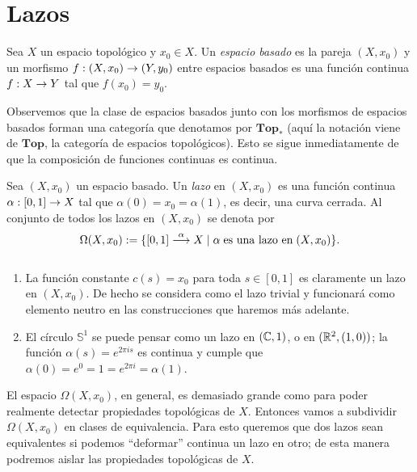 \documentclass[../../topologia_algebraica]{subfiles}
\begin{document}
\section{Lazos}
\begin{defin}
  Sea $X$ un espacio topol\'ogico y $x_0\in X$. Un \emph{espacio basado} es la pareja
  $(X,x_0)$ y un morfismo $f:(X,x_0)\rightarrow(Y,y_0)$ entre espacios basados es una funci\'on
  continua $f:X\rightarrow Y$ tal que $f(x_0)=y_0$.
\end{defin}

Observemos que la clase de espacios basados junto con los morfismos de espacios basados
forman una categor\'ia que denotamos por $\mathbf{Top}_*$ (aqu\'i la notaci\'on viene de
$\mathbf{Top}$, la categor\'ia de espacios topol\'ogicos). Esto se sigue inmediatamente
de que la composici\'on de funciones continuas es continua.

\begin{defin}
  Sea $(X,x_0)$ un espacio basado. Un \emph{lazo} en $(X,x_0)$ es una funci\'on continua
  $\alpha:[0,1]\rightarrow X$ tal que $\alpha(0)=x_0=\alpha(1)$, es decir, una curva cerrada. Al
  conjunto de todos los lazos en $(X,x_0)$ se denota por
  \[
    \Omega(X,x_0):=\{[0,1]\overset{\alpha}{\longrightarrow} X \mid \alpha\;\text{es una lazo en}\;(X,x_0)\}.
  \]
\end{defin}
\begin{ejemplo}\label{ejemplo:lazo}$\;$\\
  \begin{enumerate}
  \item La funci\'on constante $c(s)=x_0$ para toda $s\in[0,1]$ es claramente un lazo
    en $(X,x_0)$. De hecho se considera como el lazo trivial y funcionar\'a como elemento
    neutro en las construcciones que haremos m\'as adelante.
  \item El c\'irculo $\mathbb{S}^1$ se puede pensar como un lazo en $(\mathbb{C},1)$, o en $(\mathbb{R}^2,(1,0))$;
    la funci\'on $\alpha(s)=e^{2\pi i s}$ es continua y cumple que $\alpha(0)=e^0=1=e^{2\pi i}=\alpha(1)$.
  \end{enumerate}
\end{ejemplo}

El espacio $\Omega(X,x_0)$, en general, es demasiado grande como para poder realmente detectar
propiedades topol\'ogicas de $X$. Entonces vamos a subdividir $\Omega(X,x_0)$ en clases de
equivalencia. Para esto queremos que dos lazos sean equivalentes si podemos ``deformar'' continua
un lazo en otro; de esta manera podremos aislar las propiedades topol\'ogicas de $X$.
\end{document}
